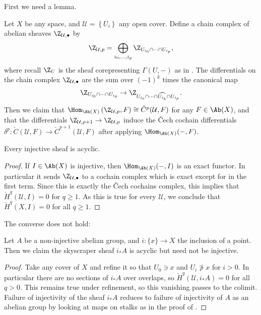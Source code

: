 \documentclass[11pt]{book}
\begin{document}
First we need a lemma.
\begin{lemma} Let $X$ be any space, and $\mathcal{U} = \left\{ U_i \right\}$ any open cover. Define a chain complex of abelian sheaves $\Z_{\mathcal{U},\bullet}$ by
\begin{align*}
    \Z_{\mathcal{U},p} = \bigoplus_{i_0, \ldots, i_p} \Z_{U_{i_0}\cap \cdots \cap U_{i_p}},
\end{align*}
where recall $\Z_U$ is the sheaf corepresenting $\Gamma(U,-)$ as in . The differentials on the chain complex $\Z_{\mathcal{U},\bullet}$ are the sum over $(-1)^k$ times the canonical map
\begin{align*}
    \Z_{U_{i_0}\cap \cdots \cap U_{i_p}} \to \Z_{U_{i_0}\cap \cdots\cap \widehat{U_{i_k}} \cap U_{i_p}}.
\end{align*}
Then we claim that $\Hom_{\Ab(X)} \left( \Z_{\mathcal{U},p},F \right)\cong \check{C}^p(\mathcal{U},F)$ for any $F\in \Ab(X)$, and that the differentials $\Z_{\mathcal{U},p+1} \to \Z_{\mathcal{U},p}$ induce the \v{C}ech cochain differentials $\delta^p \colon \check{C}(\mathcal{U},F) \to \check{C}^{p+1}(\mathcal{U},F)$ after applying $\Hom_{\Ab(X)}(-,F)$.
\end{lemma}

\begin{corollary}\label{cor:injective-sheaf-is-acyclic} 
Every injective sheaf is acyclic.
\end{corollary}
\begin{proof} If $I \in \Ab(X)$ is injective, then $\Hom_{\Ab(X)}(-,I)$ is an exact functor. In particular it sends $\Z_{\mathcal{U},\bullet}$ to a cochain complex which is exact except for in the first term. Since this is exactly the \v{C}ech cochains complex, this implies that $\check{H}^q(\mathcal{U},I) = 0$ for $q\ge 1$. As this is true for every $\mathcal{U}$, we conclude that $\check{H}^q(X,I) = 0$ for all $q\ge 1$.
\end{proof}

The converse does not hold:

\begin{example} Let $A$ be a non-injective abelian group, and $i \colon \{x\} \to X$ the inclusion of a point. Then we claim the skyscraper sheaf $i_\ast A$ is acyclic but need not be injective.
\end{example}
\begin{proof} Take any cover of $X$ and refine it so that $U_0\ni x$ and $U_i\not\ni x$ for $i>0$. In particular there are no sections of $i_\ast A$ over overlaps, so $\check{H}^q(\mathcal{U},i_\ast A) = 0$ for all $q>0$. This remains true under refinement, so this vanishing passes to the colimit. Failure of injectivity of the sheaf $i_\ast A$ reduces to failure of injectivity of $A$ as an abelian group by looking at maps on stalks as in the proof of .
\end{proof}
\end{document}
